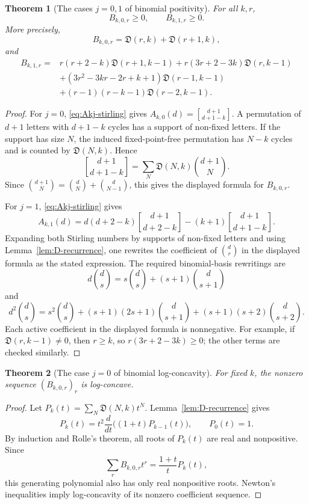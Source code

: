 \documentclass[11pt]{amsart}
\numberwithin{equation}{section}
\newtheorem{theorem}{Theorem}[section]
\theoremstyle{remark}
\newcommand{\Dder}{\mathfrak D}
\newcommand{\stir}[2]{\genfrac{[}{]}{0pt}{}{#1}{#2}}
\begin{document}
\begin{theorem}[The cases $j=0,1$ of binomial positivity]\label{thm:rank-two-known-A}
For all $k,r$,
\[
  B_{k,0,r}\ge0,\qquad B_{k,1,r}\ge0.
\]
More precisely,
\[
  B_{k,0,r}=\Dder(r,k)+\Dder(r+1,k),
\]
and
\begin{align*}
B_{k,1,r}={}&r(r+2-k)\Dder(r+1,k-1)
+r(3r+2-3k)\Dder(r,k-1)\\
&+(3r^2-3kr-2r+k+1)\Dder(r-1,k-1)\\
&+(r-1)(r-k-1)\Dder(r-2,k-1).
\end{align*}
\end{theorem}

\begin{proof}
For $j=0$, \eqref{eq:Akj-stirling} gives $A_{k,0}(d)=\stir{d+1}{d+1-k}$.  A permutation of $d+1$ letters with $d+1-k$ cycles has a support of non-fixed letters.  If the support has size $N$, the induced fixed-point-free permutation has $N-k$ cycles and is counted by $\Dder(N,k)$.  Hence
\[
  \stir{d+1}{d+1-k}=\sum_N\Dder(N,k)\binom{d+1}{N}.
\]
Since $\binom{d+1}{N}=\binom dN+\binom d{N-1}$, this gives the displayed formula for $B_{k,0,r}$.

For $j=1$, \eqref{eq:Akj-stirling} gives
\[
  A_{k,1}(d)=d(d+2-k)\stir{d+1}{d+2-k}-(k+1)\stir{d+1}{d+1-k}.
\]
Expanding both Stirling numbers by supports of non-fixed letters and using Lemma~\ref{lem:D-recurrence}, one rewrites the coefficient of $\binom dr$ in the displayed formula as the stated expression.  The required binomial-basis rewritings are
\[
  d\binom ds=s\binom ds+(s+1)\binom d{s+1}
\]
and
\[
  d^2\binom ds=s^2\binom ds+(s+1)(2s+1)\binom d{s+1}+(s+1)(s+2)\binom d{s+2}.
\]
Each active coefficient in the displayed formula is nonnegative.  For example, if $\Dder(r,k-1)\ne0$, then $r\ge k$, so $r(3r+2-3k)\ge0$; the other terms are checked similarly.
\end{proof}

\begin{theorem}[The case $j=0$ of binomial log-concavity]\label{thm:rank-two-known-B}
For fixed $k$, the nonzero sequence $(B_{k,0,r})_r$ is log-concave.
\end{theorem}

\begin{proof}
Let $P_k(t)=\sum_N\Dder(N,k)t^N$.  Lemma~\ref{lem:D-recurrence} gives
\[
  P_k(t)=t^2\frac{d}{dt}\bigl((1+t)P_{k-1}(t)\bigr),\qquad P_0(t)=1.
\]
By induction and Rolle's theorem, all roots of $P_k(t)$ are real and nonpositive.  Since
\[
  \sum_rB_{k,0,r}t^r=\frac{1+t}{t}P_k(t),
\]
this generating polynomial also has only real nonpositive roots.  Newton's inequalities imply log-concavity of its nonzero coefficient sequence.
\end{proof}
\end{document}
